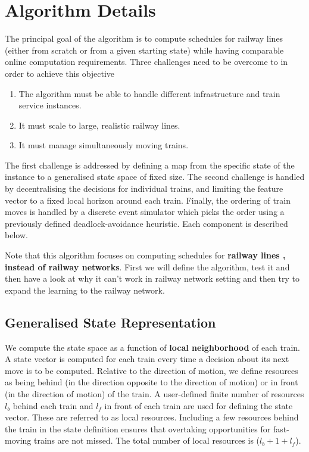 \chapter{Algorithm Details}

The principal goal of the algorithm is to compute
schedules for railway lines (either from scratch or from a given
starting state) while having comparable online computation requirements. 
Three challenges need to be overcome
to in order to achieve this objective

\begin{enumerate}
\item The algorithm must be able to handle different infrastructure and train service instances. 
\item It must scale to large, realistic railway lines.
\item It must manage simultaneously moving trains.
\end{enumerate}
The first challenge is addressed by defining a map
from the specific state of the instance to a generalised state
space of fixed size. The second challenge is handled by
decentralising the decisions for individual trains, and limiting
the feature vector to a fixed local horizon around each
train. Finally, the ordering of train moves is handled by
a discrete event simulator which picks the order using a
previously defined deadlock-avoidance heuristic. Each
component is described below.

\vspace{\baselineskip}
Note that this algorithm focuses on computing schedules for \textbf{railway lines \cite{ARTICLE:1} , \cite{ARTICLE:4} instead of railway networks}.
First we will define the algorithm, test it and then have a look at why it can't work in 
railway network setting and then try to expand the learning to the railway network.

\section{Generalised State Representation}
We compute the state space as a function of \textbf{local neighborhood} of each
train.
A state vector is computed for each train every time a
decision about its next move is to be computed. Relative to
the direction of motion, we define resources as being behind
(in the direction opposite to the direction of motion) or in
front (in the direction of motion) of the train. A user-defined
finite number of resources $ l_b $ behind each train and $ l_f $ in
front of each train are used for defining the state vector. These
are referred to as local resources. Including a few resources
behind the train in the state definition ensures that overtaking
opportunities for fast-moving trains are not missed. The total
number of local resources is ($ l_b + 1 + l_f $). 


